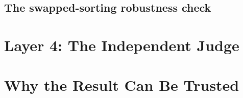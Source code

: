 \subsection{The swapped-sorting robustness check}


\section{Layer 4: The Independent Judge}
\label{sec:validation-judge}


\section{Why the Result Can Be Trusted}
\label{sec:validation-trust}

